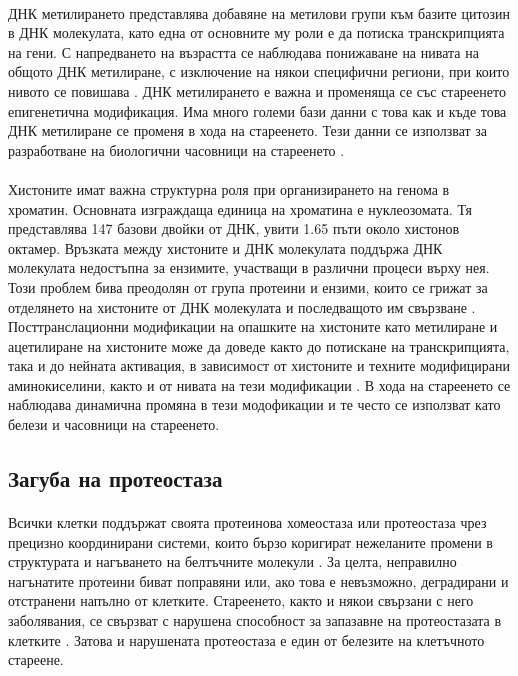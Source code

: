 \documentclass[pdftex,cyrillic,14pt,a4page,twoside,openright]{extreport}
\begin{document}
\paragraph{}
ДНК метилирането представлява добавяне на метилови групи към базите цитозин в ДНК молекулата, като една от основните му роли е да потиска транскрипцията на гени. С напредването на възрастта се наблюдава понижаване на нивата на общото ДНК метилиране, с изключение на някои специфични региони, при които нивото се повишава \cite{jung2015}. ДНК метилирането е важна и променяща се със стареенето епигенетична модификация. Има много големи бази данни с това как и къде това ДНК метилиране се променя в хода на стареенето. Тези данни се използват за разработване на биологични часовници на стареенето \cite{horvath2013}.

\paragraph{}
Хистоните имат важна структурна роля при организирането на генома в хроматин. Основната изграждаща единица на хроматина е нуклеозомата. Тя представлява 147 базови двойки от ДНК, увити 1.65 пъти около хистонов октамер. Връзката между хистоните и ДНК молекулата поддържа ДНК молекулата недостъпна за ензимите, участващи в различни процеси върху нея. Този проблем бива преодолян от група протеини и ензими, които се грижат за отделянето на хистоните от ДНК молекулата и последващото им свързване \cite{das2012}. Посттранслационни модификации на опашките на хистоните като метилиране и ацетилиране на хистоните може да доведе както до потискане на транскрипцията, така и до нейната активация, в зависимост от хистоните и техните модифицирани аминокиселини, както и от нивата на тези модификации \cite{yi2020}. В хода на стареенето се наблюдава динамична промяна в тези модофикации и те често се използват като белези и часовници на стареенето.

\subsection{Загуба на протеостаза}
\paragraph{}
Всички клетки поддържат своята протеинова хомеостаза или протеостаза чрез прецизно координирани системи, които бързо коригират нежеланите промени в структурата и нагъването на белтъчните молекули \cite{kaushik2015}. За целта, неправилно нагънатите протеини биват поправяни или, ако това е невъзможно, деградирани и отстранени напълно от клетките. Стареенето, както и някои свързани с него заболявания, се свързват с нарушена способност за запазавне на протеостазата в клетките \cite{lopezotin2013}. Затова и нарушената протеостаза е един от белезите на клетъчното стареене.
\end{document}
